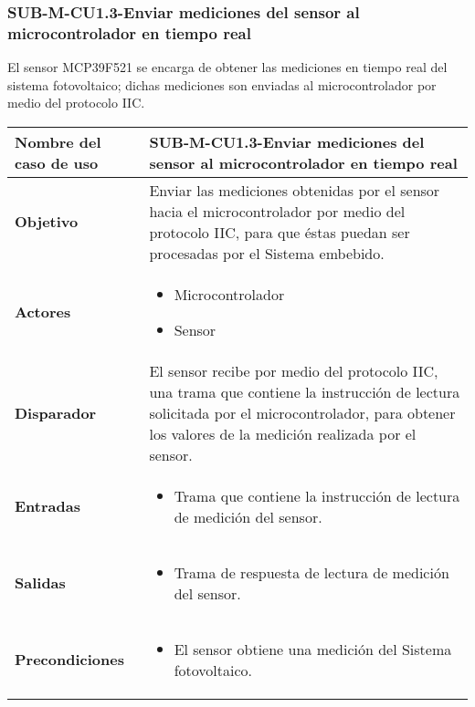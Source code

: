 \subsubsection{SUB-M-CU1.3-Enviar mediciones del sensor al microcontrolador en tiempo real}\label{SUB-M-CU1.3}
El sensor MCP39F521 se encarga de obtener las mediciones en tiempo real del sistema fotovoltaico; dichas mediciones son enviadas al microcontrolador por medio del protocolo IIC.
\begin{longtable}{|J{5cm}|J{10.3cm}|}
	\hline
	\textbf{Nombre del caso de uso} &
		SUB-M-CU1.3-Enviar mediciones del sensor al microcontrolador en tiempo real \\ \hline
	\textbf{Objetivo} &
		Enviar las mediciones obtenidas por el sensor hacia el microcontrolador por medio del protocolo IIC, para que éstas puedan ser procesadas por el Sistema embebido. \\ \hline
	\textbf{Actores} &
	    \begin{itemize}
		    \item Microcontrolador
		    \item Sensor
		\end{itemize}\\ \hline 
	\textbf{Disparador} & 
		El sensor recibe por medio del protocolo IIC, una trama que contiene la instrucción de lectura solicitada por el microcontrolador, para obtener los valores de la medición realizada por el sensor. \\ \hline 
	\textbf{Entradas} & 
		\begin{itemize}
				\item Trama que contiene la instrucción de lectura de medición del sensor.
		\end{itemize}\\ \hline 
	\textbf{Salidas} & 
	    \begin{itemize}
	        \item Trama de respuesta de lectura de medición del sensor.
	    \end{itemize}\\ \hline
	\textbf{Precondiciones} & 
		\begin{itemize}
		    \item El sensor obtiene una medición del Sistema fotovoltaico.
		\end{itemize}\\ \hline

\end{longtable}
